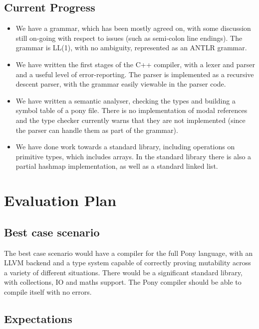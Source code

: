 \documentclass[pdftex,11pt,a4paper]{report}
\begin{document}
\section{Current Progress}

\begin{itemize}
\item We have a grammar, which has been mostly agreed on, with some discussion still on-going with respect to issues (such as semi-colon line endings).
	The grammar is LL(1), with no ambiguity, represented as an ANTLR grammar. 
\item We have written the first stages of the C++ compiler, with a lexer and parser and a useful level of error-reporting.
	The parser is implemented as a recursive descent parser, with the grammar easily viewable in the parser code.
\item We have written a semantic analyser, checking the types and building a symbol table of a pony file.
	There is no implementation of modal references and the type checker currently warns that they are not implemented (since the parser can handle them as part of the grammar).
\item We have done work towards a standard library, including operations on primitive types, which includes arrays.
	In the standard library there is also a partial hashmap implementation, as well as a standard linked list.
\end{itemize}

\newpage
\chapter{Evaluation Plan}
\label{chapter:evaluation}

\section{Best case scenario}

The best case scenario would have a compiler for the full Pony language, with an LLVM backend and a type system capable of correctly proving mutability across a variety of different situations.
There would be a significant standard library, with collections, IO and maths support.
The Pony compiler should be able to compile itself with no errors.

\section{Expectations}
\end{document}
